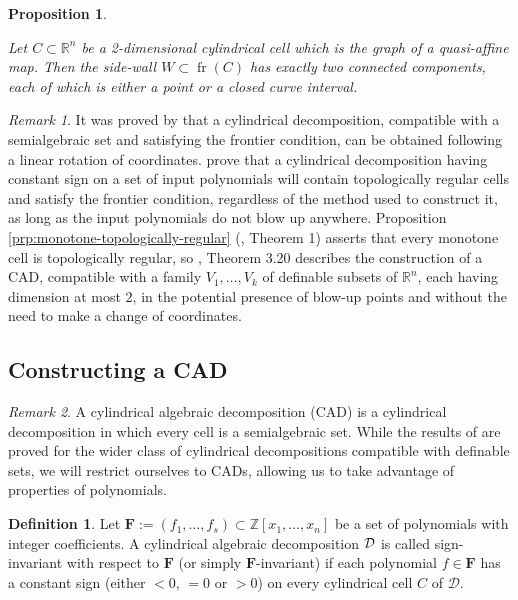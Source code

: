 \documentclass[
]{book}
\newtheorem{proposition}{Proposition}[chapter]
\theoremstyle{definition}
\newtheorem{definition}{Definition}[chapter]
\theoremstyle{definition}
\theoremstyle{definition}
\theoremstyle{definition}
\theoremstyle{remark}
\newtheorem*{remark}{Remark}
\begin{document}
\begin{proposition}
\citep[Lemma 3.4]{bgv15}

Let \(C \subset \mathbb{R}^n\) be a 2-dimensional cylindrical cell which is the graph of a quasi-affine map. Then the side-wall \(W \subset {\operatorname{fr} \left( C \right)}\) has exactly two connected components, each of which is either a point or a closed curve interval.
\end{proposition}

\begin{remark}
It was proved by \citet{pianomovers1983} that a cylindrical decomposition, compatible with a semialgebraic set and satisfying the frontier condition, can be obtained following a linear rotation of coordinates.
\citet{jhd20} prove that a cylindrical decomposition having constant sign on a set of input polynomials will contain topologically regular cells and satisfy the frontier condition, regardless of the method used to construct it, as long as the input polynomials do not blow up anywhere.
Proposition \ref{prp:monotone-topologically-regular} (\citet{bgv13}, Theorem 1) asserts that every monotone cell is topologically regular, so \citet{bgv15}, Theorem 3.20 describes the construction of a CAD, compatible with a family \(V_1,\ldots,V_k\) of definable subsets of \(\mathbb{R}^n\), each having dimension at most \(2\), in the potential presence of blow-up points and without the need to make a change of coordinates.
\end{remark}

\hypertarget{sec:cad-construction}{%
\subsection{Constructing a CAD}\label{sec:cad-construction}}

\begin{remark}
A cylindrical algebraic decomposition (CAD) is a cylindrical decomposition in which every cell is a semialgebraic set. While the results of \citet{bgv15} are proved for the wider class of cylindrical decompositions compatible with definable sets, we will restrict ourselves to CADs, allowing us to take advantage of properties of polynomials.
\end{remark}

\begin{definition}
Let \(\mathbf{F} := (f_1,\ldots,f_s) \subset \mathbb{Z}[x_1,\ldots,x_n]\) be a set of polynomials with integer coefficients. A cylindrical algebraic decomposition \(\cal D\) is called sign-invariant with respect to \(\mathbf{F}\) (or simply \(\mathbf{F}\)-invariant) if each polynomial \(f \in \mathbf{F}\) has a constant sign (either \(< 0\), \(= 0\) or \(> 0\)) on every cylindrical cell \(C\) of \(\mathcal{D}\).
\end{definition}
\end{document}
